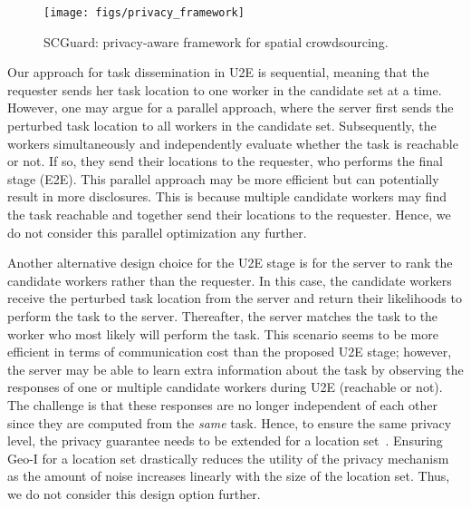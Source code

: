 \documentclass{USC-Thesis}
\newcommand{\SCG}{{SCGuard}}
\numberwithin{equation}{chapter}
\begin{document}
\begin{figure}[ht]
		\centering
\texttt{[image: figs/privacy\_framework]}
	\caption{\SCG: privacy-aware framework for spatial crowdsourcing.}
	\label{fig:privacy_framework}
\end{figure}

Our approach for task dissemination in U2E is sequential, meaning that the requester sends her task location to one worker in the candidate set at a time. However, one may argue for a parallel approach, where the server first sends the perturbed task location to all workers in the candidate set. Subsequently, the workers simultaneously and independently evaluate whether the task is reachable or not. If so, they send their locations to the requester, who performs the final stage (E2E). This parallel approach may be more efficient but can potentially result in more disclosures. This is because multiple candidate workers may find the task reachable and together send their locations to the requester. Hence, we do not consider this parallel optimization any further.
%

Another alternative design choice for the U2E stage is for the server to rank the candidate workers rather than the requester. In this case, the candidate workers receive the perturbed task location from the server and return their likelihoods to perform the task to the server. Thereafter, the server matches the task to the worker who most likely will perform the task. This scenario seems to be more efficient in terms of communication cost than the proposed U2E stage; however, the server may be able to learn extra information about the task by observing the responses of one or multiple candidate workers during U2E (reachable or not). The challenge is that these responses are no longer independent of each other since they are computed from the \emph{same} task. Hence, to ensure the same privacy level, the privacy guarantee needs to be extended for a location set~\cite{andres2013geo}. Ensuring Geo-I for a location set drastically reduces the utility of the privacy mechanism as the amount of noise increases linearly with the size of the location set. Thus, we do not consider this design option further.
\end{document}
